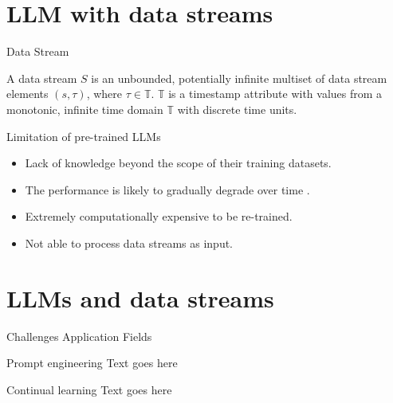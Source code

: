 \documentclass[t]{beamer}
\begin{document}
\section{LLM with data streams}
\begin{frame}{Data Stream}
  \vspace{1cm}
  \begin{definition}
    A data stream $S$ is an unbounded, potentially infinite multiset of data stream elements $(s,\tau)$, where $\tau \in \mathbb{T}$.
     $\mathbb{T}$ is a timestamp attribute with values from a monotonic, infinite time domain $\mathbb{T}$ with discrete time units. \cite{Geisler13}
  \end{definition}
\end{frame}

\begin{frame}{Limitation of pre-trained LLMs}
  \vspace{1cm}
  \begin{itemize}
    \item Lack of knowledge beyond the scope of their training datasets.
    \item The performance is likely to gradually degrade over time \cite{Shi24}.
    \item Extremely computationally expensive to be re-trained.
    \item Not able to process data streams as input.
  \end{itemize}
\end{frame}

\section{LLMs and data streams}
\begin{frame}{Challenges}
  Application Fields
\end{frame}

\begin{frame}{Prompt engineering}
  Text goes here
\end{frame}

\begin{frame}{Continual learning}
  Text goes here
\end{frame}
\end{document}
